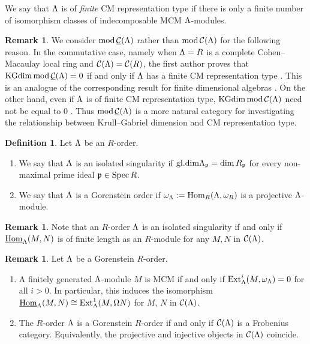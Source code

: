 \documentclass[11pt]{amsart}
\theoremstyle{definition}
\newtheorem{definition}[theorem]{Definition}
\newtheorem{remark}[theorem]{Remark}
\numberwithin{equation}{section}
\begin{document}
We say that $\Lambda$ is of {\it finite} CM representation type if there is only a finite number of isomorphism classes of indecomposable MCM $\Lambda$-modules.

\begin{remark}\label{B12}
We consider ${\mathrm{mod}}\,\underline{{\mathcal C}}(\Lambda )$ rather than ${\mathrm{mod}}\,{\mathcal C}(\Lambda )$ for the following reason. 
In the commutative case, namely when $\Lambda=R$ is a complete Cohen--Macaulay local ring and ${\mathcal C}(\Lambda )={\mathcal C}(R)$, the first author proves that $\mathrm{KGdim}\, {\mathrm{mod}}\,\underline{{\mathcal C}}(\Lambda )=0$ if and only if $\Lambda$ has a finite CM representation type \cite[Theorem 2.12]{H24}.
This is an analogue of the corresponding result for finite dimensional algebras \cite{A74}. 
On the other hand, even if $\Lambda$ is of finite CM representation type, $\mathrm{KGdim}\, {\mathrm{mod}}\,{\mathcal C}(\Lambda )$ need not be equal to $0$ \cite[Remark 2.13]{H24}.
Thus ${\mathrm{mod}}\,\underline{{\mathcal C}}(\Lambda )$ is a more natural category for investigating the relationship between Krull--Gabriel dimension and CM representation type. 
\end{remark}


\begin{definition}
Let $\Lambda$ be an $R$-order. 
\begin{enumerate}[\rm(1)]
\item We say that $\Lambda$ is an isolated singularity if $\mathrm{gl.dim} \Lambda_{\mathfrak p} = \dim R_{\mathfrak p}$ for every non-maximal prime ideal $\mathfrak p \in \mathrm{Spec}\, R$.    

\item We say that $\Lambda$ is a Gorenstein order if $\omega_{\Lambda} := \mathrm{Hom}_R (\Lambda , \omega_R)$ is a projective $\Lambda$-module. 
\end{enumerate}
\end{definition}

\begin{remark}
Note that an $R$-order $\Lambda$ is an isolated singularity if and only if $\underline{\mathrm{Hom}}_{\Lambda} (M, N)$ is of finite length as an $R$-module for any $M,N$ in ${\mathcal C}(\Lambda )$.  
\end{remark}

\begin{remark}
Let $\Lambda$ be a Gorenstein $R$-order. 
\begin{enumerate}[\rm(1)]
\item A finitely generated $\Lambda$-module $M$ is MCM if and only if $\mathrm{Ext}^i _\Lambda ( M , \omega_{\Lambda})=0$ for all $i >0$. 
In particular, this induces the isomorphism $\underline{\mathrm{Hom}}_{\Lambda} (M, N)\cong \mathrm{Ext}^1 _{\Lambda}(M, \Omega N)$ for $M$, $N$ in ${\mathcal C}(\Lambda )$. 

\item The $R$-order $\Lambda$ is a Gorenstein $R$-order if and only if ${\mathcal C}(\Lambda )$ is a Frobenius category. 
Equivalently, the projective and injective objects in ${\mathcal C}(\Lambda )$ coincide. 
\end{enumerate}
\end{remark}
\end{document}
